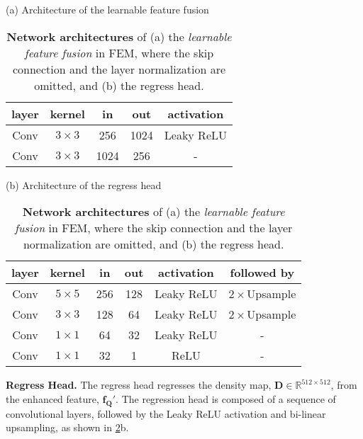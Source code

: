 \documentclass[10pt,twocolumn,letterpaper]{article}
\newcommand{\fout}{\bm{f_Q'}}
\begin{document}
\begin{table}[t]
    \caption{
        \textbf{Network architectures} of (a) the \textit{learnable feature fusion} in FEM, where the skip connection and the layer normalization are omitted, and (b) the regress head. 
    }
    \vspace{8pt}
    \label{appendix:tab:conv}
    \scriptsize
    \begin{minipage}[t]{0.5\textwidth}
    \setlength\tabcolsep{8pt}
    \centering
    (a) Architecture of the learnable feature fusion \\
    \vspace{3pt}
    \begin{tabular}{ccccc}
        \toprule
        layer & kernel & in & out & activation \\
        \midrule
        Conv   & $3 \times 3$ & 256 & 1024 & Leaky ReLU \\
        \midrule
        Conv   & $3 \times 3$ & 1024 & 256 & - \\
        \bottomrule
    \end{tabular}
    \end{minipage}
    \vfill
    \vspace{8pt}
    \begin{minipage}[t]{0.5\textwidth}
    \setlength\tabcolsep{6pt}
    \centering
    (b) Architecture of the regress head \\
    \vspace{3pt}
    \begin{tabular}{cccccc}
    \toprule
        layer & kernel & in & out & activation & followed by \\
        \midrule
        Conv & $5 \times 5$ & 256 & 128 & Leaky ReLU & $2 \times$Upsample \\
        \midrule
        Conv & $3 \times 3$ & 128 & 64 & Leaky ReLU & $2 \times$Upsample \\
        \midrule
        Conv & $1 \times 1$ & 64 & 32 & Leaky ReLU & - \\
        \midrule
        Conv & $1 \times 1$ & 32 & 1  & ReLU & - \\
        \bottomrule
    \end{tabular}
    \end{minipage}
\end{table}


\vspace{2pt}\noindent\textbf{Regress Head.} The regress head regresses the density map, $\bm{D} \in \mathbb{R}^{512 \times 512}$, from the enhanced feature, $\fout$. 
The regression head is composed of a sequence of convolutional layers, followed by the Leaky ReLU activation and bi-linear upsampling, as shown in \cref{appendix:tab:conv}b. 
\end{document}
